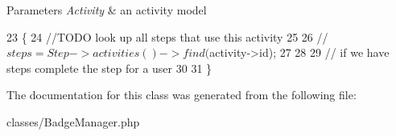 \begin{DoxyParams}{Parameters}
{\em Activity} & an activity model \\
\hline
\end{DoxyParams}

\begin{DoxyCode}
23     \{
24         \textcolor{comment}{//TODO look up all steps that use this activity}
25 
26         \textcolor{comment}{//$steps = Step->activities()->find($activity->id);}
27 
28 
29         \textcolor{comment}{// if we have steps complete the step for a user}
30 
31     \}
\end{DoxyCode}


The documentation for this class was generated from the following file\+:\begin{DoxyCompactItemize}
\item 
classes/Badge\+Manager.\+php\end{DoxyCompactItemize}
